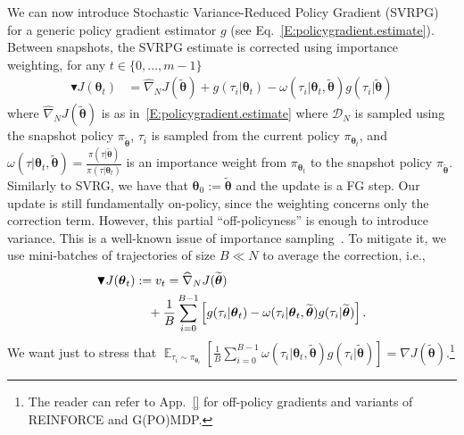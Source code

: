 \documentclass{article}
\makeatletter
\theoremstyle{remark}
\theoremstyle{definition}
\DeclareRobustCommand{\eg}{e.g.,\@\xspace}
\DeclareRobustCommand{\ie}{i.e.,\@\xspace}
\DeclareMathOperator*{\EV}{\mathbb{E}}
\newcommand{\EVV}[2][\ppvect \in \ppspace]{\EV_{#1}\left[{#2}\right]}
\newcommand{\vtheta}{\boldsymbol{\theta}}
\newcommand{\Reward}{\mathcal{R}}
\newcommand{\wt}[1]{\widetilde{#1}}
\newcommand{\wh}[1]{\widehat{#1}}
\makeatother
\begin{document}
We can now introduce Stochastic Variance-Reduced Policy Gradient (SVRPG) for a generic policy gradient estimator $g$ (see Eq.~\ref{E:policygradient.estimate}).
Between snapshots, the SVRPG estimate is corrected using importance weighting, for any $t \in \{0,\ldots,m-1\}$
\begin{align*}
        \blacktriangledown J(\vtheta_{t}) &= \wh{\nabla}_N J(\wt{\vtheta}) + g(\tau_i|\vtheta_t) - \omega(\tau_i|\vtheta_t, \wt{\vtheta}) g(\tau_i|\wt{\vtheta})
\end{align*}
where $\wh{\nabla}_N J(\wt{\vtheta})$ is as in~\eqref{E:policygradient.estimate} where $\mathcal{D}_N$ is sampled using the snapshot policy $\pi_{\wt{\vtheta}}$, $\tau_i$ is sampled from the current policy $\pi_{\vtheta_t}$, and $\omega(\tau|\vtheta_t, \wt{\vtheta}) = \frac{\pi(\tau|\wt{\vtheta})}{\pi(\tau|\vtheta_t)}$ is an importance weight from $\pi_{\vtheta_t}$ to the snapshot policy $\pi_{\wt{\vtheta}}$. 
Similarly to SVRG, we have that $\vtheta_0 := \wt{\vtheta}$ and the update is a FG step.
Our update is still fundamentally on-policy, since the weighting concerns only the correction term. However, this partial ``off-policyness'' is enough to introduce variance. This is a well-known issue of importance sampling~\citep[\eg][]{thomas2015high}. To mitigate it, we use mini-batches of trajectories of size $B \ll N$ to average the correction, \ie
\begin{align}\label{E:svrpg.estimate.batch}
        \blacktriangledown J(\vtheta_{t}) &:= v_t= \wh{\nabla}_N J(\wt{\vtheta})\\ \notag
                                            & \quad{} + \frac{1}{B} \sum_{i=0}^{B-1} \left[
        g(\tau_i|\vtheta_t) - \omega(\tau_i|\vtheta_t, \wt{\vtheta}) g(\tau_i|\wt{\vtheta})
        \right].
\end{align}
We want just to stress that $\EVV[\tau_i \sim \pi_{\vtheta_t}]{\frac{1}{B} \sum_{i=0}^{B-1} \omega(\tau_i|\vtheta_t, \wt{\vtheta}) g(\tau_i|\wt{\vtheta})} = \nabla J(\wt{\vtheta})$.\footnote{The reader can refer to App.~\ref{} for off-policy gradients and variants of REINFORCE and G(PO)MDP.}
\end{document}
